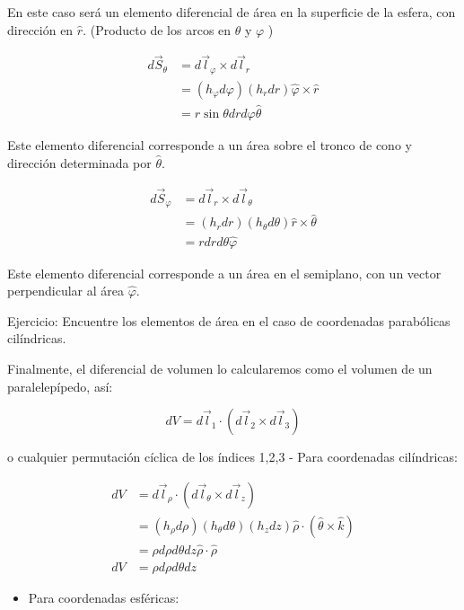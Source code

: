 En este caso será un elemento diferencial de área en la superficie de la esfera, con dirección en $\widehat{r}$. (Producto de los arcos en $\theta$ y $\varphi$ )

$$
\begin{aligned}
d \vec{S}_{\theta} & =d \vec{l}_{\varphi} \times d \vec{l}_{r} \\
& =\left(h_{\varphi} d \varphi\right)\left(h_{r} d r\right) \widehat{\varphi} \times \widehat{r} \\
& =r \sin \theta d r d \varphi \widehat{\theta}
\end{aligned}
$$

Este elemento diferencial corresponde a un área sobre el tronco de cono y dirección determinada por $\hat{\theta}$.

$$
\begin{aligned}
d \vec{S}_{\varphi} & =d \vec{l}_{r} \times d \vec{l}_{\theta} \\
& =\left(h_{r} d r\right)\left(h_{\theta} d \theta\right) \widehat{r} \times \widehat{\theta} \\
& =r d r d \theta \widehat{\varphi}
\end{aligned}
$$

Este elemento diferencial corresponde a un área en el semiplano, con un vector perpendicular al área $\widehat{\varphi}$.

Ejercicio: Encuentre los elementos de área en el caso de coordenadas parabólicas cilíndricas.

Finalmente, el diferencial de volumen lo calcularemos como el volumen de un paralelepípedo, así:

$$
d V=d \vec{l}_{1} \cdot\left(d \vec{l}_{2} \times d \vec{l}_{3}\right)
$$

o cualquier permutación cíclica de los índices 1,2,3 - Para coordenadas cilíndricas:

$$
\begin{aligned}
d V & =d \vec{l}_{\rho} \cdot\left(d \vec{l}_{\theta} \times d \vec{l}_{z}\right) \\
& =\left(h_{\rho} d \rho\right)\left(h_{\theta} d \theta\right)\left(h_{z} d z\right) \widehat{\rho} \cdot(\widehat{\theta} \times \widehat{k}) \\
& =\rho d \rho d \theta d z \widehat{\rho} \cdot \widehat{\rho} \\
d V & =\rho d \rho d \theta d z
\end{aligned}
$$

\begin{itemize}
  \item Para coordenadas esféricas:
\end{itemize}


